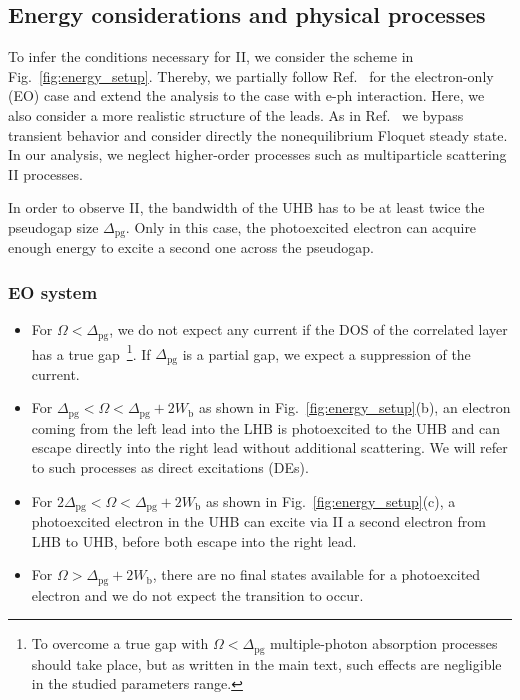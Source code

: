 \documentclass[aps,prb,groupedaddress,showpacs,twocolumn,superscriptaddress,10pt]{revtex4-2}
\begin{document}
\subsection{Energy considerations and physical processes}
\label{sec:explicative_scheme}

To infer the conditions necessary for II, we consider the  scheme in Fig.~\ref{fig:energy_setup}. Thereby, we partially follow Ref.~\cite{so.do.18} for the electron-only (EO) case and extend the analysis to the case with e-ph interaction. Here, we also consider a more realistic structure of the leads.
As in Ref.~\cite{so.do.18} we bypass transient behavior and consider directly the nonequilibrium Floquet steady state. In our analysis, we neglect higher-order processes such as multiparticle scattering II processes. 

In order to observe II, the bandwidth of the UHB has to be at least twice the pseudogap size $\Delta_{\text{pg}}$. Only in this case, the photoexcited electron can acquire enough energy to excite a second one across the pseudogap. 

\subsubsection{EO system}
\label{sec:scheme_only_electrons}  
 
\begin{itemize}
\item For $\Omega<\Delta_{\text{pg}}$, we do not expect any current if the DOS of the correlated layer has a true gap~\footnote{To overcome a true gap with $\Omega<\Delta_{\text{pg}}$ multiple-photon absorption processes should take place, but as written in the main text, such effects are negligible in the studied parameters range.}. If $\Delta_{\text{pg}}$ is a partial gap, we expect a suppression of the current.
\item For $\Delta_{\text{pg}}<\Omega<\Delta_{\text{pg}}+2W_{\text{b}}$ as shown in Fig.~\ref{fig:energy_setup}(b), an electron coming from the left lead into the LHB is photoexcited to the UHB and can escape directly into the right lead without additional scattering. We will refer to such processes as direct excitations (DEs).
\item For $2\Delta_{\text{pg}}<\Omega<\Delta_{\text{pg}}+2W_{\text{b}}$ as shown in Fig.~\ref{fig:energy_setup}(c), a photoexcited electron in the UHB can excite via II a second electron from LHB to UHB, before both escape into the right lead.
\item For $\Omega>\Delta_{\text{pg}}+2W_{\text{b}}$, there are no final states available for a photoexcited electron and we do not expect the transition to occur. 
\end{itemize}
\end{document}
